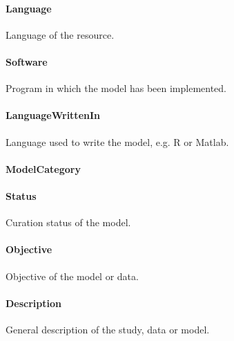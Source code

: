 \documentclass[a4paper]{report}
\begin{document}
\paragraph{Language}
Language of the resource.

\paragraph{Software}
Program in which the model has been implemented.

\paragraph{LanguageWrittenIn}
Language used to write the model, e.g. R or Matlab.

\paragraph{ModelCategory}

\paragraph{Status}
Curation status of the model.

\paragraph{Objective}
Objective of the model or data.

\paragraph{Description}
General description of the study, data or model.
\end{document}
